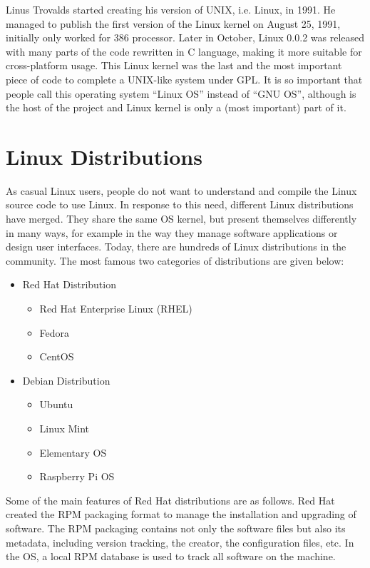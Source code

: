 Linus Trovalds started creating his version of UNIX, i.e. Linux, in 1991. He managed to publish the first version of the Linux kernel on August 25, 1991, initially only worked for 386 processor. Later in October, Linux 0.0.2 was released with many parts of the code rewritten in C language, making it more suitable for cross-platform usage. This Linux kernel was the last and the most important piece of code to complete a UNIX-like system under GPL. It is so important that people call this operating system ``Linux OS'' instead of ``GNU OS'', although is the host of the project and Linux kernel is only a (most important) part of it.

\section{Linux Distributions}

As casual Linux users, people do not want to understand and compile the Linux source code to use Linux. In response to this need, different Linux distributions have merged. They share the same OS kernel, but present themselves differently in many ways, for example in the way they manage software applications or design user interfaces. Today, there are hundreds of Linux distributions in the community. The most famous two categories of distributions are given below:
\begin{itemize}
  \item Red Hat Distribution
  \begin{itemize}
    \item Red Hat Enterprise Linux (RHEL)
    \item Fedora
    \item CentOS
  \end{itemize}
  \item Debian Distribution
  \begin{itemize}
    \item Ubuntu
    \item Linux Mint
    \item Elementary OS
    \item Raspberry Pi OS
  \end{itemize}
\end{itemize}

Some of the main features of Red Hat distributions are as follows. Red Hat created the RPM packaging format to manage the installation and upgrading of software. The RPM packaging contains not only the software files but also its metadata, including version tracking, the creator, the configuration files, etc. In the OS, a local RPM database is used to track all software on the machine. 

